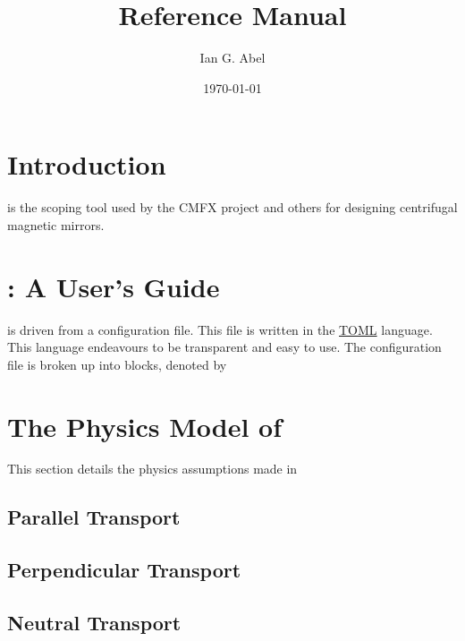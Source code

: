 \documentclass{revtex4}
\begin{document}
\date{\today}

\title{\mctrans Reference Manual}
\author{Ian G. Abel}


\maketitle
\section{Introduction}

\mctrans is the scoping tool used by the CMFX project and others for designing centrifugal magnetic mirrors.

\section{\mctrans: A User's Guide}

\mctrans is driven from a configuration file. This file is written in the \href{https://github.com/toml-lang/toml}{TOML} language. This language endeavours
to be transparent and easy to use. The configuration file is broken up into blocks, denoted by 

\section{The Physics Model of \mctrans}
This section details the physics assumptions made in 
\subsection{Parallel Transport}
\subsection{Perpendicular Transport}
\subsection{Neutral Transport}

\appendix
\end{document}
